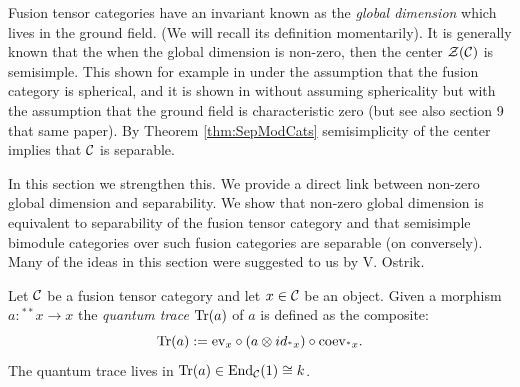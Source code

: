 \documentclass{amsart}
\begin{document}
Fusion tensor categories have an invariant known as the \emph{global dimension} which lives in the ground field. (We will recall its definition momentarily). It is generally known that the when the global dimension is non-zero, then the center $\mathcal Z(\mathcal C)$ is semisimple. This shown for example in \cite[Prop. 3.10]{MR1966525} under the assumption that the fusion category is spherical, and it is shown in \cite[Thm. 2.15]{MR2183279} without assuming sphericality but with the assumption that the ground field is characteristic zero (but see also section 9 that same paper). 
By Theorem \ref{thm:SepModCats} semisimplicity of the center implies that $\mathcal C$ is separable. 

In this section we strengthen this. We provide a direct link between non-zero global dimension and separability. We show that non-zero global dimension is equivalent to separability of the fusion tensor category and that  semisimple bimodule categories over such fusion categories are separable (on conversely). Many of the ideas in this section were suggested to us by V. Ostrik. 

Let $\mathcal C$ be a fusion tensor category and let $x \in \mathcal C$ be an object. Given a morphism $a: {}^{**}x \to x$ the {\em quantum trace} $\mathrm{Tr}(a)$ of $a$ is defined as the composite: %
\begin{equation*}
	\mathrm{Tr}(a) := \mathrm{ev}_x \circ (a \otimes id_{{}^*x}) \circ \mathrm{coev}_{{}^*x}.
\end{equation*}
The quantum trace lives in $\mathrm{Tr}(a) \in \operatorname{End}_\mathcal C(1) \cong k$. 
\end{document}
